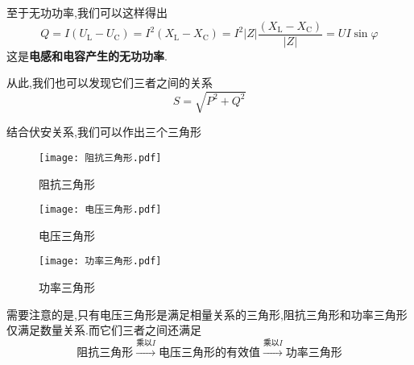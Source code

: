 至于无功功率,我们可以这样得出
\begin{equation}
    Q=I\left( U_{\mathrm{L}}-U_{\mathrm{C}} \right) =I^2\left( X_{\mathrm{L}}-X_{\mathrm{C}} \right) =I^2\left| Z \right|\frac{\left( X_{\mathrm{L}}-X_{\mathrm{C}} \right)}{\left| Z \right|}=UI \sin \varphi 
\end{equation}
这是\textbf{电感和电容产生的无功功率}.

从此,我们也可以发现它们三者之间的关系
\begin{equation}
    S=\sqrt{P^2+Q^2}
\end{equation}

\Par 结合伏安关系,我们可以作出三个三角形
\begin{figure}[htbp]
	\centering
	\begin{minipage}{0.3\textwidth}
        \centering
        \texttt{[image: 阻抗三角形.pdf]}
        \caption{阻抗三角形}
        \label{fig:阻抗三角形}
    \end{minipage}
    \begin{minipage}{0.3\textwidth}
        \centering
        \texttt{[image: 电压三角形.pdf]}
        \caption{电压三角形}
        \label{fig:电压三角形}
    \end{minipage}
    \begin{minipage}{0.3\textwidth}
        \centering
        \texttt{[image: 功率三角形.pdf]}
        \caption{功率三角形}
        \label{fig:功率三角形}
    \end{minipage}
\end{figure}

需要注意的是,只有电压三角形是满足相量关系的三角形,阻抗三角形和功率三角形仅满足数量关系.而它们三者之间还满足
\begin{equation}
    \text{阻抗三角形}\xrightarrow{\text{乘以}I}\text{电压三角形的有效值}\xrightarrow{\text{乘以}I}\text{功率三角形}
\end{equation}


